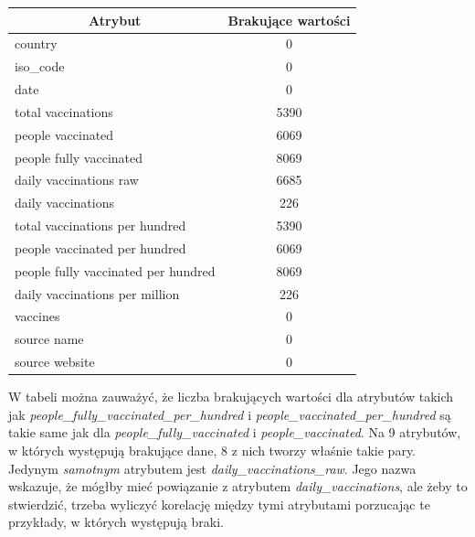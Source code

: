 \documentclass[12pt, oneside, openany]{article}
\begin{document}
\begin{center}
\begin{table}[h]
\begin{tabular}{|l|c|}
\hline
\multicolumn{1}{|c|}{\textbf{Atrybut}} & \textbf{Brakujące wartości} \\ \hline
country                                & 0                           \\ \hline
iso\_code                              & 0                           \\ \hline
date                                   & 0                           \\ \hline
total vaccinations                     & 5390                        \\ \hline
people vaccinated                      & 6069                        \\ \hline
people fully vaccinated                & 8069                        \\ \hline
daily vaccinations raw                 & 6685                        \\ \hline
daily vaccinations                     & 226                         \\ \hline
total vaccinations per hundred         & 5390                        \\ \hline
people vaccinated per hundred          & 6069                        \\ \hline
people fully vaccinated per hundred    & 8069                        \\ \hline
daily vaccinations per million         & 226                         \\ \hline
vaccines                               & 0                           \\ \hline
source name                            & 0                           \\ \hline
source website                         & 0                           \\ \hline
\end{tabular}
\end{table}
\end{center}

W tabeli można zauważyć, że liczba brakujących wartości dla atrybutów takich jak \textit{people\_fully\_vaccinated\_per\_hundred} i \textit{people\_vaccinated\_per\_hundred} są takie same jak dla \textit{people\_fully\_vaccinated} i \textit{people\_vaccinated}. Na 9 atrybutów, w których występują brakujące dane, 8 z nich tworzy właśnie takie pary. Jedynym \textit{samotnym} atrybutem jest \textit{daily\_vaccinations\_raw}. Jego nazwa wskazuje, że mógłby mieć powiązanie z atrybutem \textit{daily\_vaccinations}, ale żeby to stwierdzić, trzeba wyliczyć korelację między tymi atrybutami porzucając te przykłady, w których występują braki. 
\end{document}
